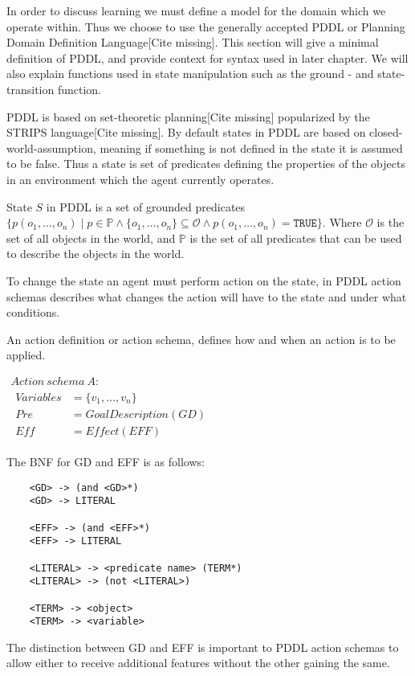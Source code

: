 \documentclass[../Master.tex]{subfiles}
\begin{document}
In order to discuss learning we must define a model for the domain which we operate within. Thus we choose to use the generally accepted PDDL or Planning Domain Definition Language[Cite missing]. This section will give a minimal definition of PDDL, and provide context for syntax used in later chapter. We will also explain functions used in state manipulation such as the ground - and state-transition function.

PDDL is based on set-theoretic planning[Cite missing] popularized by the STRIPS language[Cite missing]. By default states in PDDL are based on closed-world-assumption, meaning if something is not defined in the state it is assumed to be false. Thus a state is set of predicates defining the properties of the objects in an environment which the agent currently operates.

\begin{definition} 
	State $S$ in PDDL is a set of grounded predicates $\{p(o_1,\dots,o_n) \mid  p \in \mathbb{P} \land \{o_1,\dots,o_n\} \subseteq \mathcal{O} \land p(o_1,\dots,o_n) = \texttt{TRUE}\}$. Where $\mathcal{O}$ is the set of all objects in the world, and $\mathbb{P}$ is the set of all predicates that can be used to describe the objects in the world.
\end{definition}

To change the state an agent must perform action on the state, in PDDL action schemas describes what changes the action will have to the state and under what conditions. 

	
	\begin{definition} 
		An action definition or action schema, defines how and when an action is to be applied. 
		
		$
		\begin{array}{ll}
		Action ~ schema ~ A: & \\
		
		\begin{array}{ll}
		Variables & = \{v_1,\dots,v_n\}			 \\  
		Pre	& = Goal Description(GD) \\
		Eff & = Effect(EFF) 
		\end{array}
		\end{array}$
		
		The BNF for GD and EFF is as follows:
		
		\begin{lstlisting}
	<GD> -> (and <GD>*) 
	<GD> -> LITERAL
	
	<EFF> -> (and <EFF>*)
	<EFF> -> LITERAL
	
	<LITERAL> -> <predicate name> (TERM*)
	<LITERAL> -> (not <LITERAL>)
	
	<TERM> -> <object>
	<TERM> -> <variable>
		\end{lstlisting}
		
		The distinction between GD and EFF is important to PDDL action schemas to allow either to receive additional features without the other gaining the same.
	\end{definition}
	
\end{document}
